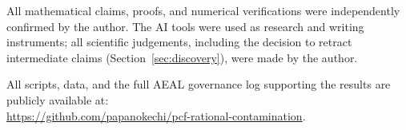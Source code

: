 \documentclass[11pt]{amsart}
\theoremstyle{definition}
\theoremstyle{remark}
\begin{document}
All mathematical claims, proofs, and numerical
verifications were independently confirmed by the
author. The AI tools were used as research and
writing instruments; all scientific judgements,
including the decision to retract intermediate
claims (Section~\ref{sec:discovery}), were made by the author.

All scripts, data, and the full AEAL governance
log supporting the results are publicly available at:\\
\url{https://github.com/papanokechi/pcf-rational-contamination}.
\end{document}
